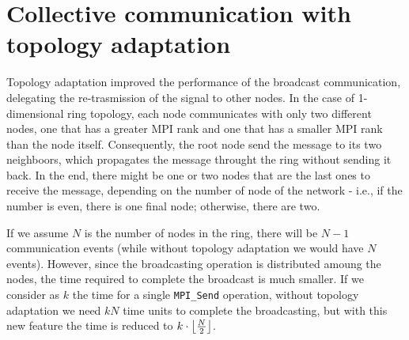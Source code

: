 \documentclass[a4paper]{article}
\DeclarePairedDelimiter\floor{\lfloor}{\rfloor}
\begin{document}
\newpage

\section{Collective communication with topology adaptation}

Topology adaptation improved the performance of the broadcast communication, delegating the re-trasmission of the signal to other nodes. In the case of 1-dimensional ring topology, each node communicates with only two different nodes, one that has a greater MPI rank and one that has a smaller MPI rank than the node itself. Consequently, the root node send the message to its two neighboors, which propagates the message throught the ring without sending it back. In the end, there might be one or two nodes that are the last ones to receive the message, depending on the number of node of the network - i.e., if the number is even, there is one final node; otherwise, there are two.

If we assume $N$ is the number of nodes in the ring, there will be $N-1$ communication events (while without topology adaptation we would have $N$ events). However, since the broadcasting operation is distributed amoung the nodes, the time required to complete the broadcast is much smaller. If we consider as $k$ the time for a single \texttt{MPI\_Send} operation, without topology adaptation we need $kN$ time units to complete the broadcasting, but with this new feature the time is reduced to $k \cdot \floor*{\frac{N}{2}}$.
\end{document}
